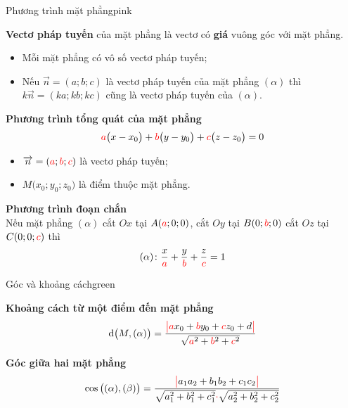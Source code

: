 \documentclass[12pt,a4paper,landscape]{book}
\begin{document}
\begin{multicols*}{3}
		\vfill\null
		\columnbreak
		\begin{khung_trello}{Phương trình mặt phẳng}{pink}
			\begin{khung_trello_box}
				\textbf{\color{trello_bg_pink}Vectơ pháp tuyến} của mặt phẳng là vectơ có \textbf{giá} vuông góc với mặt phẳng.
				\begin{itemize}[leftmargin=5mm]
					\item Mỗi mặt phẳng có vô số vectơ pháp tuyến;
					\item Nếu $\overrightarrow{n}=(a;b;c)$ là vectơ pháp tuyến của mặt phẳng $(\alpha)$ thì $k\overrightarrow{n}=(ka;kb;kc)$ cũng là vectơ pháp tuyến của $(\alpha)$.
				\end{itemize}
			\end{khung_trello_box}
			\begin{khung_trello_box}
				\textbf{\color{trello_bg_pink}Phương trình tổng quát của mặt phẳng}
				$${\color{red}a}\big(x-x_0\big)+{\color{red}b}\big(y-y_0\big)+{\color{red}c}\big(z-z_0\big)=0$$
				\begin{itemize}[leftmargin=5mm]
					\item $\overrightarrow{n}=({\color{red}a};{\color{red}b};{\color{red}c})$ là vectơ pháp tuyến;
					\item $M\big(x_0;y_0;z_0\big)$ là điểm thuộc mặt phẳng.
				\end{itemize}
			\end{khung_trello_box}
			\begin{khung_trello_box}
				\textbf{\color{trello_bg_pink}Phương trình đoạn chắn}\\
				Nếu mặt phẳng $(\alpha)$ cắt $Ox$ tại $A({\color{red}a};0;0)$, cắt $Oy$ tại $B(0;{\color{red}b};0)$ cắt $Oz$ tại $C(0;0;{\color{red}c})$ thì
				$$(\alpha)\colon\dfrac{x}{\color{red}a}+\dfrac{y}{\color{red}b}+\dfrac{z}{\color{red}c}=1$$
			\end{khung_trello_box}
		\end{khung_trello}
		\begin{khung_trello}{Góc và khoảng cách}{green}
			\begin{khung_trello_box}
				\textbf{\color{trello_bg_green}Khoảng cách từ một điểm đến mặt phẳng}
				$$\mathrm{d}\big(M,(\alpha)\big)=\dfrac{{\color{red}\big|}{\color{red}a}x_0+{\color{red}b}y_0+{\color{red}c}z_0+d{\color{red}\big|}}{\sqrt{{\color{red}a}^2+{\color{red}b}^2+{\color{red}c}^2}}$$
			\end{khung_trello_box}
			\begin{khung_trello_box}
				\textbf{\color{trello_bg_green}Góc giữa hai mặt phẳng}
				$$\cos\big((\alpha),(\beta)\big)=\dfrac{{\color{red}\big|}a_1a_2+b_1b_2+c_1c_2{\color{red}\big|}}{\sqrt{a_1^2+b_1^2+c_1^2}{\color{red}\cdot}\sqrt{a_2^2+b_2^2+c_2^2}}$$
			\end{khung_trello_box}
		\end{khung_trello}
	\end{multicols*}
\end{document}
